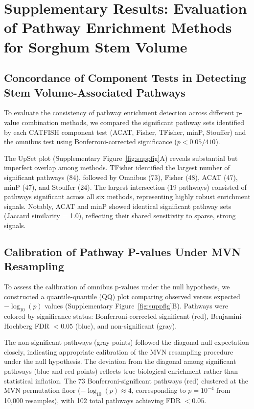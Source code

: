 \documentclass[11pt]{article}
\begin{document}
\section{Supplementary Results: Evaluation of Pathway Enrichment Methods for Sorghum Stem Volume}

\subsection{Concordance of Component Tests in Detecting Stem Volume-Associated Pathways}

To evaluate the consistency of pathway enrichment detection across different p-value combination methods, we compared the significant pathway sets identified by each CATFISH component test (ACAT, Fisher, TFisher, minP, Stouffer) and the omnibus test using Bonferroni-corrected significance ($p < 0.05/410$).

The UpSet plot (Supplementary Figure~\ref{fig:suppfig}A) reveals substantial but imperfect overlap among methods. TFisher identified the largest number of significant pathways (84), followed by Omnibus (73), Fisher (48), ACAT (47), minP (47), and Stouffer (24). The largest intersection (19 pathways) consisted of pathways significant across all six methods, representing highly robust enrichment signals. Notably, ACAT and minP showed identical significant pathway sets (Jaccard similarity = 1.0), reflecting their shared sensitivity to sparse, strong signals.

\subsection{Calibration of Pathway P-values Under MVN Resampling}

To assess the calibration of omnibus p-values under the null hypothesis, we constructed a quantile-quantile (QQ) plot comparing observed versus expected $-\log_{10}(p)$ values (Supplementary Figure~\ref{fig:suppfig}B). Pathways were colored by significance status: Bonferroni-corrected significant (red), Benjamini-Hochberg FDR $< 0.05$ (blue), and non-significant (gray).

The non-significant pathways (gray points) followed the diagonal null expectation closely, indicating appropriate calibration of the MVN resampling procedure under the null hypothesis. The deviation from the diagonal among significant pathways (blue and red points) reflects true biological enrichment rather than statistical inflation. The 73 Bonferroni-significant pathways (red) clustered at the MVN permutation floor ($-\log_{10}(p) \approx 4$, corresponding to $p = 10^{-4}$ from 10,000 resamples), with 102 total pathways achieving FDR $< 0.05$.
\end{document}
